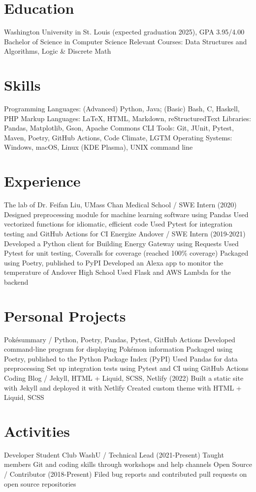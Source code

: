 \begin{outline}
\0 \section{Education}
    \1 Washington University in St. Louis (expected graduation 2025),  GPA 3.95/4.00
        \2 Bachelor of Science in Computer Science
        \2 Relevant Courses: Data Structures and Algorithms, Logic \& Discrete Math

\0 \section{Skills}
    \1 Programming Languages: (Advanced) Python, Java; (Basic) Bash, C, Haskell, PHP 
    \1 Markup Languages: \LaTeX, HTML, Markdown, reStructuredText 
    \1 Libraries: Pandas, Matplotlib, Gson, Apache Commons CLI 
    \1 Tools: Git, JUnit, Pytest, Maven, Poetry, GitHub Actions, Code Climate, LGTM 
    \1 Operating Systems: Windows, macOS, Linux (KDE Plasma), UNIX command line 

\0 \section{Experience}
    \1 The lab of Dr. Feifan Liu, UMass Chan Medical School / SWE Intern (2020)
        \2 Designed preprocessing module for machine learning software using Pandas
        \2 Used vectorized functions for idiomatic, efficient code
        \2 Used Pytest for integration testing and GitHub Actions for CI
    \1 Energize Andover / SWE Intern (2019-2021)
        \2 Developed a Python client for Building Energy Gateway using Requests
        \2 Used Pytest for unit testing, Coveralls for coverage (reached 100\% coverage)
        \2 Packaged using Poetry, published to PyPI
        \2 Developed an Alexa app to monitor the temperature of Andover High School
        \2 Used Flask and AWS Lambda for the backend

\0 \section{Personal Projects}
    \1 Pokésummary / Python, Poetry, Pandas, Pytest, GitHub Actions
        \2 Developed command-line program for displaying Pokémon information
        \2 Packaged using Poetry, published to the Python Package Index (PyPI)
        \2 Used Pandas for data preprocessing
        \2 Set up integration tests using Pytest and CI using GitHub Actions
    \1 Coding Blog / Jekyll, HTML + Liquid, SCSS, Netlify (2022)
        \2 Built a static site with Jekyll and deployed it with Netlify
        \2 Created custom theme with HTML + Liquid, SCSS

\0 \section{Activities}
    \1 Developer Student Club WashU / Technical Lead (2021-Present)
        \2 Taught members Git and coding skills through workshops and help channels
    \1 Open Source / Contributor (2018-Present)
        \2 Filed bug reports and contributed pull requests on open source repositories

\end{outline}
